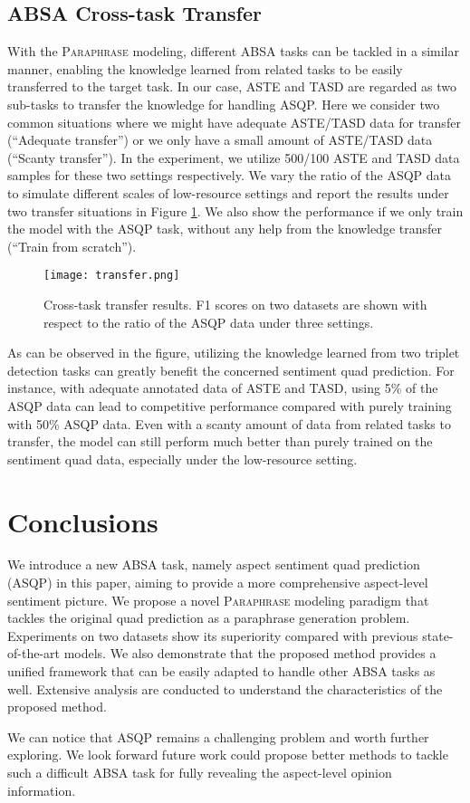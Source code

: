 \documentclass[11pt]{article}
\begin{document}
\subsection{ABSA Cross-task Transfer}
With the \textsc{Paraphrase} modeling, different ABSA tasks can be tackled in a similar manner, enabling the knowledge learned from related tasks to be easily transferred to the target task.
In our case, ASTE and TASD are regarded as two sub-tasks to transfer the knowledge for handling ASQP. 
Here we consider two common situations where we might have adequate ASTE/TASD data for transfer (``Adequate transfer'') or we only have a small amount of ASTE/TASD data (``Scanty transfer''). In the experiment, we utilize 500/100 ASTE and TASD data samples for these two settings respectively.
We vary the ratio of the ASQP data to simulate different scales of low-resource settings and report the results under two transfer situations in Figure \ref{fig:transfer}. We also show the performance if we only train the model with the ASQP task, without any help from the knowledge transfer (``Train from scratch''). 

\begin{figure}
    \centering
    \texttt{[image: transfer.png]}
    \caption{Cross-task transfer results. F1 scores on two datasets are shown with respect to the ratio of the ASQP data under three settings.}
    \label{fig:transfer}
    \vspace{-0.3cm}
\end{figure}

As can be observed in the figure, utilizing the knowledge learned from two triplet detection tasks can greatly benefit the concerned sentiment quad prediction.
For instance, with adequate annotated data of ASTE and TASD, using 5\% of the ASQP data can lead to competitive performance compared with purely training with 50\% ASQP data.
Even with a scanty amount of data from related tasks to transfer, the model can still perform much better than purely trained on the sentiment quad data, especially under the low-resource setting.


\section{Conclusions}
We introduce a new ABSA task, namely aspect sentiment quad prediction (ASQP) in this paper, aiming to provide a more comprehensive aspect-level sentiment picture. We propose a novel \textsc{Paraphrase} modeling paradigm that tackles the original quad prediction as a paraphrase generation problem. Experiments on two datasets show its superiority compared with previous state-of-the-art models. 
We also demonstrate that the proposed method provides a unified framework that can be easily adapted to handle other ABSA tasks as well. Extensive analysis are conducted to understand the characteristics of the proposed method.

We can notice that ASQP remains a challenging problem
and worth further exploring. We look forward future work could propose better methods to tackle such a difficult ABSA task for fully revealing the aspect-level opinion information.

\typeout{}


\end{document}
